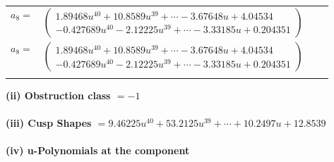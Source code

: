 \documentclass[1p]{elsarticle_modified}
\theoremstyle{definition}
\begin{document}
\begin{tabular}{m{7pt} m{180pt} m{7pt} m{180pt} }
\flushright $a_{8}=$&$\begin{pmatrix}1.89468 u^{40}+10.8589 u^{39}+\cdots-3.67648 u+4.04534\\-0.427689 u^{40}-2.12225 u^{39}+\cdots-3.33185 u+0.204351\end{pmatrix}$\\ \flushright $a_{8}=$&$\begin{pmatrix}1.89468 u^{40}+10.8589 u^{39}+\cdots-3.67648 u+4.04534\\-0.427689 u^{40}-2.12225 u^{39}+\cdots-3.33185 u+0.204351\end{pmatrix}$\\&\end{tabular}
\flushleft \textbf{(ii) Obstruction class $= -1$}\\~\\
\flushleft \textbf{(iii) Cusp Shapes $= 9.46225 u^{40}+53.2125 u^{39}+\cdots+10.2497 u+12.8539$}\\~\\
\newpage\renewcommand{\arraystretch}{1}
\flushleft \textbf{(iv) u-Polynomials at the component}\newline \\
\end{document}
